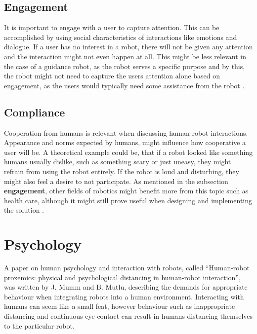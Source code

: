 \subsection{Engagement}\label{subsec:Engagement}
It is important to engage with a user to capture attention. This can be accomplished by using social characteristics of interactions like emotions and dialogue. If a user has no interest in a robot, there will not be given any attention and the interaction might not even happen at all. This might be less relevant in the case of a guidance robot, as the robot serves a specific purpose and by this, the robot might not need to capture the users attention alone based on engagement, as the users would typically need some assistance from the robot \cite{HRIMetrics}.
\subsection{Compliance}
Cooperation from humans is relevant when discussing human-robot interactions. Appearance and norms expected by humans, might influence how cooperative a user will be. A theoretical example could be, that if a robot looked like something humans usually dislike, such as something scary or just uneasy, they might refrain from using the robot entirely. If the robot is loud and disturbing, they might also feel a desire to not participate. As mentioned in the subsection \textbf{engagement}, other fields of robotics might benefit more from this topic such as health care, although it might still prove useful when designing and implementing the solution \cite{HRIMetrics}.

\section{Psychology}\label{sec:Psychology}
A paper on human psychology and interaction with robots, called “Human-robot proxemics: physical and
psychological distancing in human-robot interaction”\cite{mumm2011human}, was written by J. Mumm and B. Mutlu, describing the demands for appropriate behaviour when integrating robots into a human environment.
Interacting with humans can seem like a small feat, however behaviour such as inappropriate distancing and continuous eye contact can result in humans distancing themselves to the particular robot.\\

